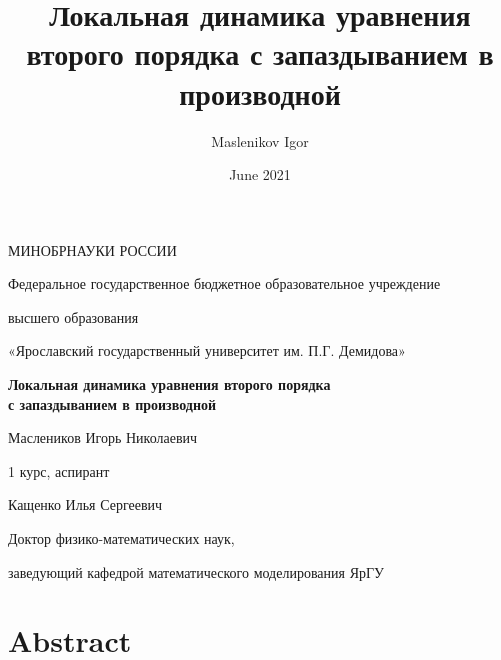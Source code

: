\documentclass[12pt]{article} %
\title{Локальная динамика уравнения второго порядка с запаздыванием в производной}
\author{Maslenikov Igor}
\date{June 2021}
\begin{document}
\onehalfspacing
	\begin{titlepage}
		 \begin{center}
			\large
			
			\vspace{0.5cm}
			
		\vspace{0.5cm}
		
		
			\vspace{0.5cm}
			
			
			\vfill
			\vspace{0.5cm}
			
			МИНОБРНАУКИ РОССИИ
			
			
			\vspace{0.5cm}
			
		Федеральное государственное бюджетное образовательное учреждение 
		
		высшего образования
		
		\vspace{0.5cm}
		
		«Ярославский государственный университет им. П.Г. Демидова»
		
			\vspace{0.5cm}
			
			\vspace{0.5cm}
			
			\textbf{Локальная динамика уравнения второго порядка\\ с запаздыванием в производной }\\
			
			\vspace{0.5cm}

			Маслеников Игорь Николаевич

1 курс, аспирант

Кащенко Илья Сергеевич

Доктор физико-математических наук, 

заведующий кафедрой математического моделирования ЯрГУ 

			\vfill
			
			
			\bigskip
			
			
		\end{center}

	
	
	\end{titlepage}

\newpage
\section*{Abstract}
\end{document}
